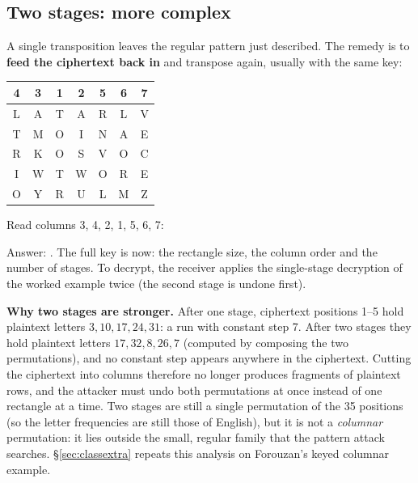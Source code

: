 \subsection{Two stages: more complex}
A single transposition leaves the regular pattern just described. The remedy is to \textbf{feed the ciphertext back in} and transpose again, usually with the same key:
\begin{center}\small
\begin{minipage}[c]{0.4\textwidth}\centering
\begin{tabular}{|*{7}{c|}}
\multicolumn{1}{c}{4}&\multicolumn{1}{c}{3}&\multicolumn{1}{c}{\textbf{1}}&\multicolumn{1}{c}{2}&\multicolumn{1}{c}{5}&\multicolumn{1}{c}{6}&\multicolumn{1}{c}{7}\\
\hline
L&A&\cellcolor{warn!18}T&A&R&L&V\\ \hline
T&M&\cellcolor{warn!18}O&I&N&A&E\\ \hline
R&K&\cellcolor{warn!18}O&S&V&O&C\\ \hline
I&W&\cellcolor{warn!18}T&W&O&R&E\\ \hline
O&Y&\cellcolor{warn!18}R&U&L&M&Z\\ \hline
\end{tabular}
\end{minipage}
\begin{minipage}[c]{0.5\textwidth}
Read columns 3, 4, 2, 1, 5, 6, 7:\\[2pt]
\end{minipage}
\end{center}
Answer: \textbf{}.
The full key is now: the rectangle size, the column order and the number of stages. To decrypt, the receiver applies the single-stage decryption of the worked example twice (the second stage is undone first).

\textbf{Why two stages are stronger.} After one stage, ciphertext positions 1--5 hold plaintext letters $3, 10, 17, 24, 31$: a run with constant step 7. After two stages they hold plaintext letters $17, 32, 8, 26, 7$ (computed by composing the two permutations), and no constant step appears anywhere in the ciphertext. Cutting the ciphertext into columns therefore no longer produces fragments of plaintext rows, and the attacker must undo both permutations at once instead of one rectangle at a time. Two stages are still a single permutation of the 35 positions (so the letter frequencies are still those of English), but it is not a \emph{columnar} permutation: it lies outside the small, regular family that the pattern attack searches. \S\ref{sec:classextra} repeats this analysis on Forouzan's keyed columnar example.

